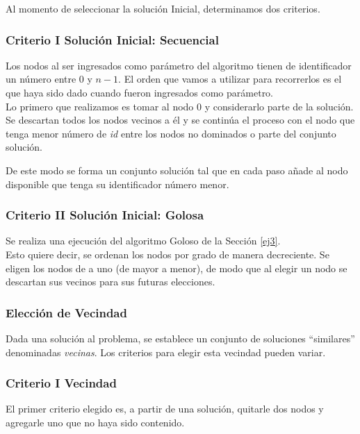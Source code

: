 Al momento de seleccionar la solución Inicial, determinamos dos criterios.

\subsubsection*{Criterio I Solución Inicial: Secuencial}

Los nodos al ser ingresados como parámetro del algoritmo tienen de identificador un número entre $0$ y $n-1$. El orden que vamos a utilizar para recorrerlos es el que haya sido dado cuando fueron ingresados como parámetro.\\

Lo primero que realizamos es tomar al nodo $0$ y considerarlo parte de la solución. Se descartan todos los nodos vecinos a él y se continúa el proceso con el nodo que tenga menor número de \textit{id} entre los nodos no dominados o parte del conjunto soluci\'on.

De este modo se forma un conjunto solución tal que en cada paso añade al nodo disponible que tenga su identificador número menor.

\subsubsection*{Criterio II Solución Inicial: Golosa}

Se realiza una ejecución del algoritmo Goloso de la Sección \ref{ej3}.\\

Esto quiere decir, se ordenan los nodos por grado de manera decreciente. Se eligen los nodos de a uno (de mayor a menor), de modo que al elegir un nodo se descartan sus vecinos para sus futuras elecciones.

\subsubsection{Elección de Vecindad}

Dada una soluci\'on al problema, se establece un conjunto de soluciones ``similares'' denominadas \emph{vecinas}. Los criterios para elegir esta vecindad pueden variar.

\subsubsection*{Criterio I Vecindad}

El primer criterio elegido es, a partir de una soluci\'on, quitarle dos nodos y agregarle uno que no haya sido contenido.\\

